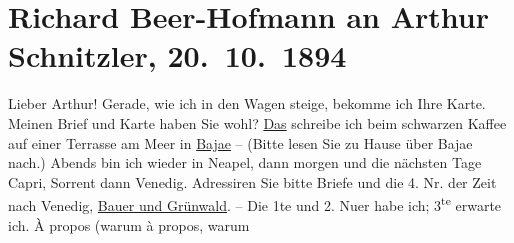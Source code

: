 

         
         \renewcommand{\erwaehntePersonen}{Personen: Hermann Bahr, Richard Beer-Hofmann, Max Eugen Burckhard, Guy de Maupassant}
         \renewcommand{\erwaehnteInstitutionen}{Institutionen: Deutscher Schulverein, Die Zeit. Wiener Wochenschrift}
         \renewcommand{\erwaehnteOrte}{Orte: Baia, Capri, Grand Hotel Bauer-Grünwald, Neapel, Pallanza, Prag, Sorrent, Venedig, Wien}
         \renewcommand{\erwaehnteWerke}{Werke: Der Abonnent, Die Schmetterlingsschlacht. Komödie in 4 Akten, Die Zeit. Wiener Wochenschrift, Dora}
               \section[Richard Beer-Hofmann an Arthur Schnitzler, 20. 10. 1894]{ Richard Beer-Hofmann an Arthur Schnitzler, 20. 10. 1894}\nopagebreak{}\rehead{ }\begin{ledgroupsized}[t]{13cm}\normalsize\beginnumbering{} \toendnotes[C]{\smallbreak\pagebreak[2]} 
\toendnotes[C]{\smallbreak}\pstart
           \noindent{}{\pb}Lieber Arthur! Gerade, wie ich in den Wagen steige, bekomme ich Ihre
               Karte. Meinen Brief  und Karte haben Sie wohl?\pend
           \pstart
           \uline{Das} schreibe ich beim schwarzen Kaffee auf einer
               Terrasse am Meer in \uline{Bajae} – (Bitte lesen Sie zu Hause über Bajae
               nach.) Abends bin ich wieder in Neapel, dann
               morgen und die nächsten Tage Capri, Sorrent dann Venedig. Adressiren Sie bitte Briefe und die 4. Nr. der Zeit nach Venedig, \uline{Bauer und Grünwald}. – Die 1te und 2. Nu{\geminationm}er habe ich; 3\textsuperscript{te} erwarte ich. {\pb}À propos (warum à propos, warum

\end{ledgroupsized}
